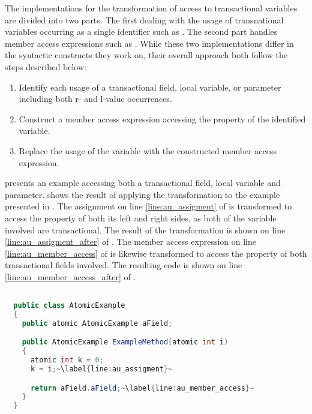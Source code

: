 The implementations for the transformation of access to transactional variables are divided into two parts. The first dealing with the usage of transnational variables occurring as a single identifier such as . The second part handles member access expressions such as . While these two implementations differ in the syntactic constructs they work on, their overall approach both follow the steps described below:

\begin{enumerate}
	\item Identify each usage of a transactional field, local variable, or parameter including both r- and l-value occurrences.
	\item Construct a member access expression accessing the  property of the identified variable.
	\item Replace the usage of the variable with the constructed member access expression. 
\end{enumerate}

 presents an example accessing both a transactional field, local variable and parameter.  shows the result of applying the transformation to the example presented in . The assignment on line \ref{line:au_assigment} of  is transformed to access the  property of both its left and right sides, as both of the variable involved are transactional. The result of the transformation is shown on line \ref{line:au_assigment_after} of . The member access expression on line \ref{line:au_member_access} of  is likewise transformed to access the  property of both transactional fields involved. The resulting code is shown on line \ref{line:au_member_access_after} of .

\begin{lstlisting}[label=lst:before_atomic_usage,
  caption={Usage of \bscode{atomic} Variables Before Transformation},
  language=Java,  
  showspaces=false,
  showtabs=false,
  breaklines=true,
  showstringspaces=false,
  breakatwhitespace=true,
  escapechar=~,
  commentstyle=\color{greencomments},
  keywordstyle=\color{bluekeywords},
  stringstyle=\color{redstrings},
  morekeywords={atomic, retry, orelse, var, get, set}]  % Start your code-block

  public class AtomicExample
  {
    public atomic AtomicExample aField;

    public AtomicExample ExampleMethod(atomic int i)
    {
      atomic int k = 0;
      k = i;~\label{line:au_assigment}~

      return aField.aField;~\label{line:au_member_access}~
    }
  }
\end{lstlisting}

